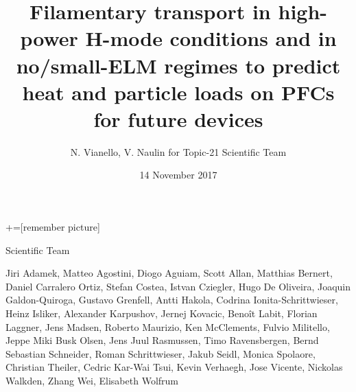 \documentclass[10pt, compress]{beamer}
\title{{\small Filamentary transport in high-power H-mode conditions and in
  no/small-ELM regimes to predict heat and particle loads on PFCs for
  future devices}}
\date{{\footnotesize 14 November 2017}}
\author[N. Vianello and V. Naulin]{N. Vianello, V. Naulin for Topic-21
Scientific Team}
\begin{document}
+=[remember picture]
\maketitle
\begin{frame}{Scientific Team}
\begin{center}
  Jiri Adamek, Matteo Agostini, Diogo Aguiam, Scott Allan, Matthias Bernert, Daniel Carralero Ortiz, 
Stefan Costea, Istvan Cziegler, Hugo De Oliveira, Joaquin Galdon-Quiroga, Gustavo Grenfell, Antti Hakola, 
Codrina Ionita-Schrittwieser, Heinz Isliker, Alexander Karpushov, Jernej Kovacic, Benoît Labit, Florian Laggner, Jens Madsen, 
Roberto Maurizio, Ken McClements, Fulvio Militello, Jeppe Miki Busk Olsen, Jens Juul Rasmussen, Timo Ravensbergen, Bernd Sebastian Schneider, Roman Schrittwieser, Jakub Seidl, Monica Spolaore, Christian Theiler, Cedric Kar-Wai Tsui, Kevin Verhaegh, Jose Vicente, 
Nickolas Walkden, Zhang Wei, Elisabeth Wolfrum
\end{center}
\end{frame}
\end{document}
